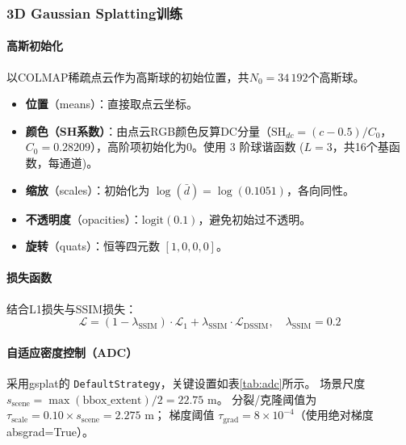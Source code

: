 \documentclass{article}
\begin{document}
\subsubsection{3D Gaussian Splatting训练}

\paragraph{高斯初始化}
以COLMAP稀疏点云作为高斯球的初始位置，共$N_0 = 34\,192$个高斯球。
\begin{itemize}
  \item \textbf{位置}（means）：直接取点云坐标。
  \item \textbf{颜色（SH系数）}：由点云RGB颜色反算DC分量（$\text{SH}_{dc} =
        (c - 0.5) / C_0$，$C_0=0.28209$），高阶项初始化为0。使用 3 阶球谐函数
        ($L=3$，共16个基函数，每通道)。
  \item \textbf{缩放}（scales）：初始化为 $\log(\bar{d}) = \log(0.1051)$，各向同性。
  \item \textbf{不透明度}（opacities）：$\text{logit}(0.1)$，避免初始过不透明。
  \item \textbf{旋转}（quats）：恒等四元数 $[1, 0, 0, 0]$。
\end{itemize}

\paragraph{损失函数}
结合L1损失与SSIM损失：
\begin{equation}
  \mathcal{L} = (1-\lambda_{\text{SSIM}}) \cdot \mathcal{L}_1 +
                \lambda_{\text{SSIM}} \cdot \mathcal{L}_{\text{DSSIM}},
  \quad \lambda_{\text{SSIM}} = 0.2
\end{equation}

\paragraph{自适应密度控制（ADC）}
采用gsplat的 \texttt{DefaultStrategy}，关键设置如表\ref{tab:adc}所示。
场景尺度 $s_{\text{scene}} = \max(\text{bbox\_extent})/2 = 22.75$ m。
分裂/克隆阈值为 $\tau_{\text{scale}} = 0.10 \times s_{\text{scene}} = 2.275$ m；
梯度阈值 $\tau_{\text{grad}} = 8\times10^{-4}$（使用绝对梯度 absgrad=True）。
\end{document}
